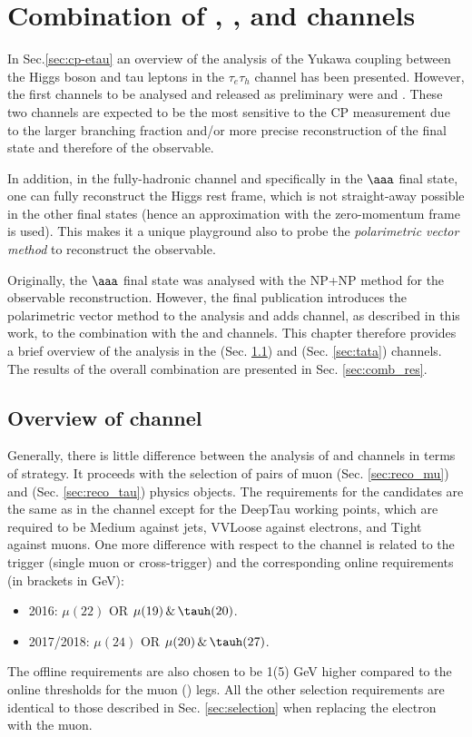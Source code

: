 \chapter{Combination of \et, \mt, and \tata channels}\label{sec:comb}

In Sec.\ref{sec:cp-etau} an overview of the analysis of the Yukawa coupling between the Higgs boson and tau leptons in the $\tau_e\tau_h$ channel has been presented. However, the first channels to be analysed and released as preliminary were \mt and \tata \cite{CMS:2020rpr, Cardini:2021hbb}. These two channels are expected to be the most sensitive to the CP measurement due to the larger branching fraction and/or more precise reconstruction of the final state and therefore of the \phicp observable. 

In addition, in the fully-hadronic \tata channel and specifically in the $\aaa$ final state, one can fully reconstruct the Higgs rest frame, which is not straight-away possible in the other final states (hence an approximation with the zero-momentum frame is used). This makes it a unique playground also to probe the \textit{polarimetric vector method} to reconstruct the \phicp observable. 

Originally, the $\aaa$ final state was analysed with the NP+NP method for the \phicp observable reconstruction. However, the final publication \cite{CMS:2021sdq} introduces the polarimetric vector method to the analysis and adds \et channel, as described in this work, to the combination with the \mt and \tata channels. This chapter therefore provides a brief overview of the analysis in the \mt (Sec. \ref{sec:mt}) and \tata (Sec. \ref{sec:tata}) channels. The results of the overall combination are presented in Sec. \ref{sec:comb_res}.

\section{Overview of \mt channel}\label{sec:mt}
Generally, there is little difference between the analysis of \mt and \et channels in terms of strategy. It proceeds with the selection of pairs of muon (Sec. \ref{sec:reco_mu}) and \tauh (Sec. \ref{sec:reco_tau}) physics objects. The requirements for the \tauh candidates are the same as in the \et channel except for the DeepTau working points, which are required to be Medium against jets, VVLoose against electrons, and Tight against muons. One more difference with respect to the \et channel is related to the trigger (single muon or cross-trigger) and the corresponding online \pt requirements (in brackets in GeV):
    \begin{itemize}
        \item 2016: $\mu(22)$ OR $\mu(19) \, \& \, \tauh(20)$.
        \item 2017/2018: $\mu(24)$ OR $\mu(20) \, \& \, \tauh(27)$.
    \end{itemize}
The offline \pt requirements are also chosen to be 1(5) GeV higher compared to the online \pt thresholds for the muon (\tauh) legs. All the other selection requirements are identical to those described in Sec. \ref{sec:selection} when replacing the electron with the muon.

